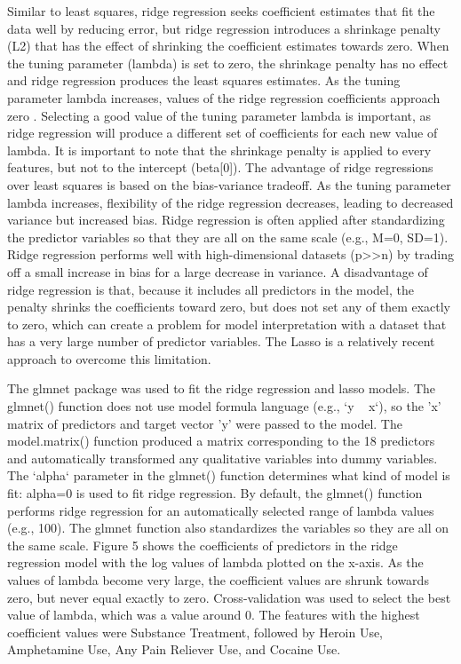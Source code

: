 \documentclass[sigconf]{acmart}
\begin{document}
Similar to least squares, ridge regression seeks coefficient estimates that
fit the data well by reducing error, but ridge regression introduces a 
shrinkage penalty (L2) that has the effect of shrinking the coefficient 
estimates towards zero. When the tuning parameter (lambda) is set to zero, 
the shrinkage penalty has no effect and ridge regression produces the least
squares estimates. As the tuning parameter lambda increases, values of the 
ridge regression coefficients approach zero \cite{statlearn13}. Selecting a 
good value of the tuning parameter lambda is important, as ridge
regression will produce a different set of coefficients for each new value of 
lambda. It is important to note that the shrinkage penalty is applied to every
features, but not to the intercept (beta[0]). The advantage of ridge 
regressions over least squares is based on the bias-variance tradeoff. As 
the tuning parameter lambda increases, flexibility of the ridge regression 
decreases, leading to decreased variance but increased bias. Ridge regression 
is often applied after standardizing the predictor variables so that they are 
all on the same scale (e.g., M=0, SD=1). Ridge regression performs 
well with high-dimensional datasets (p>>n) by trading off a small increase
in bias for a large decrease in variance. A disadvantage of ridge regression 
is that, because it includes all predictors in the model, the penalty shrinks
the coefficients toward zero, but does not set any of them exactly to zero, 
which can create a problem for model interpretation with a dataset that
has a very large number of predictor variables. The Lasso is a relatively
recent approach to overcome this limitation. 


The glmnet package was used to fit the ridge regression and lasso models. 
The glmnet() function does not use model formula language (e.g., `y ~ x`), 
so the 'x' matrix of predictors and target vector 'y' were passed to the 
model. The model.matrix() function produced a matrix corresponding to the 
18 predictors and automatically transformed any qualitative variables into
dummy variables. The `alpha` parameter in the glmnet() function determines 
what kind of model is fit: alpha=0 is used to fit ridge regression. 
By default, the glmnet() function performs ridge regression for an 
automatically selected range of lambda values (e.g., 100). The glmnet 
function also standardizes the variables so they are all on the same scale.
Figure 5 shows the coefficients of predictors in the ridge regression model 
with the log values of lambda plotted on the x-axis. As the values of lambda 
become very large, the coefficient values are shrunk towards zero, but 
never equal exactly to zero. Cross-validation was used to select the best 
value of lambda, which was a value around 0. The features with the highest 
coefficient values were Substance Treatment, followed by Heroin Use, 
Amphetamine Use, Any Pain Reliever Use, and Cocaine Use. 
\end{document}
